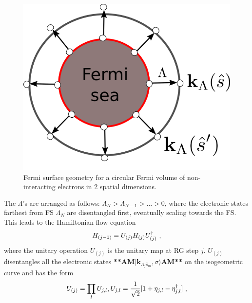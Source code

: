 \documentclass[aps,prl,preprint,groupedaddress]{revtex4-2}
\begin{document}
\begin{figure}
\includegraphics[scale=0.5]{2dKondoTN.png}
\caption{Fermi surface geometry for a circular Fermi volume of non-interacting electrons in 2 spatial dimensions.}
\label{FSgeom}
\end{figure}
\par\noindent
The $\Lambda$'s are arranged as follows: $\Lambda_{N}>\Lambda_{N-1}>\ldots>0$, where the electronic states farthest from FS $\Lambda_{N}$ are disentangled first, eventually scaling towards the FS. This leads to the Hamiltonian flow equation
\begin{equation}
\centering
H_{(j-1)}=U_{(j)}H_{(j)}U^{\dagger}_{(j)}~,
\end{equation}
where the unitary operation $U_{(j)}$ is the unitary map at RG step $j$. $U_{(j)}$ disentangles all the electronic states \textbf{**AM}$|\mathbf{k}_{\Lambda_{j}\hat{s}_{m}},\sigma\rangle$\textbf{AM**} on the isogeometric curve and has the form\cite{anirbanmotti}
\begin{equation}
\centering U_{(j)}=\prod_{l}U_{j,l}, U_{j,l}=\frac{1}{\sqrt{2}}[1+\eta_{j,l}-\eta^{\dagger}_{j,l}]~,
\end{equation}
\end{document}
